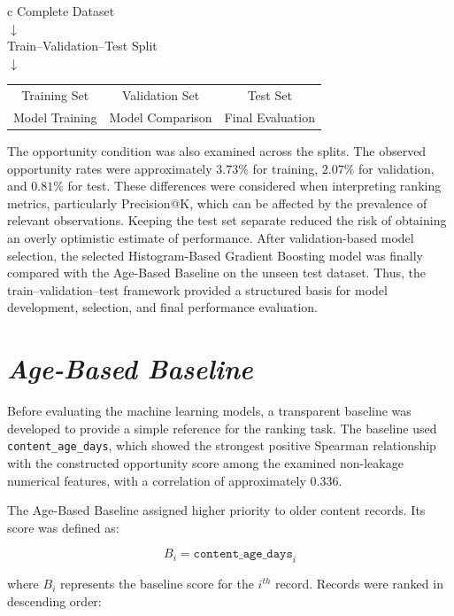 \documentclass[12pt,a4paper]{report}
\begin{document}
\begin{center}
\begin{tabular}{c}
Complete Dataset \\
$\downarrow$ \\
Train--Validation--Test Split \\
$\downarrow$ \\
\begin{tabular}{ccc}
Training Set & Validation Set & Test Set \\
Model Training & Model Comparison & Final Evaluation
\end{tabular}
\end{tabular}
\end{center}

The opportunity condition was also examined across the splits. The observed opportunity rates were approximately $3.73\%$ for training, $2.07\%$ for validation, and $0.81\%$ for test. These differences were considered when interpreting ranking metrics, particularly Precision@K, which can be affected by the prevalence of relevant observations. Keeping the test set separate reduced the risk of obtaining an overly optimistic estimate of performance. After validation-based model selection, the selected Histogram-Based Gradient Boosting model was finally compared with the Age-Based Baseline on the unseen test dataset. Thus, the train--validation--test framework provided a structured basis for model development, selection, and final performance evaluation.


\section{\textit{Age-Based Baseline}}
Before evaluating the machine learning models, a transparent baseline was developed to provide a simple reference for the ranking task. The baseline used \texttt{content\_age\_days}, which showed the strongest positive Spearman relationship with the constructed opportunity score among the examined non-leakage numerical features, with a correlation of approximately $0.336$.

The Age-Based Baseline assigned higher priority to older content records. Its score was defined as:

\begin{equation}
B_i = \texttt{content\_age\_days}_i
\end{equation}

where $B_i$ represents the baseline score for the $i^{th}$ record. Records were ranked in descending order:
\end{document}

